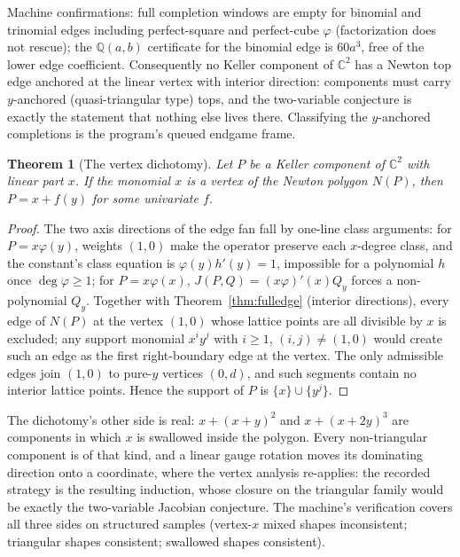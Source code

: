 \documentclass[11pt]{article}
\newtheorem{theorem}{Theorem}[section]
\theoremstyle{definition}
\theoremstyle{remark}
\newcommand{\C}{\mathbb{C}}
\begin{document}
Machine confirmations: full completion windows are empty for binomial and trinomial edges
including perfect-square and perfect-cube $\varphi$ (factorization does not rescue); the
$\mathbb{Q}(a,b)$ certificate for the binomial edge is $60a^3$, free of the lower edge
coefficient. Consequently no Keller component of $\C^2$ has a Newton top edge anchored at
the linear vertex with interior direction: components must carry $y$-anchored
(quasi-triangular type) tops, and the two-variable conjecture is exactly the statement that
nothing else lives there. Classifying the $y$-anchored completions is the program's queued
endgame frame.

\begin{theorem}[The vertex dichotomy]\label{thm:dichotomy}
Let $P$ be a Keller component of $\C^2$ with linear part $x$. If the monomial $x$ is a
vertex of the Newton polygon $N(P)$, then $P = x + f(y)$ for some univariate $f$.
\end{theorem}

\begin{proof}[Proof]
The two axis directions of the edge fan fall by one-line class arguments: for
$P = x\varphi(y)$, weights $(1,0)$ make the operator preserve each $x$-degree class, and
the constant's class equation is $\varphi(y) h'(y) = 1$, impossible for a polynomial $h$
once $\deg \varphi \ge 1$; for $P = x\varphi(x)$, $J(P,Q) = (x\varphi)'(x) Q_y$ forces a
non-polynomial $Q_y$. Together with Theorem~\ref{thm:fulledge} (interior directions), every
edge of $N(P)$ at the vertex $(1,0)$ whose lattice points are all divisible by $x$ is
excluded; any support monomial $x^i y^j$ with $i \ge 1$, $(i,j) \ne (1,0)$ would create
such an edge as the first right-boundary edge at the vertex. The only admissible edges join
$(1,0)$ to pure-$y$ vertices $(0,d)$, and such segments contain no interior lattice points.
Hence the support of $P$ is $\{x\} \cup \{y^j\}$.
\end{proof}

The dichotomy's other side is real: $x + (x+y)^2$ and $x + (x+2y)^3$ are components in
which $x$ is swallowed inside the polygon. Every non-triangular component is of that kind,
and a linear gauge rotation moves its dominating direction onto a coordinate, where the
vertex analysis re-applies: the recorded strategy is the resulting induction, whose closure
on the triangular family would be exactly the two-variable Jacobian conjecture. The
machine's verification covers all three sides on structured samples (vertex-$x$ mixed
shapes inconsistent; triangular shapes consistent; swallowed shapes consistent).
\end{document}
